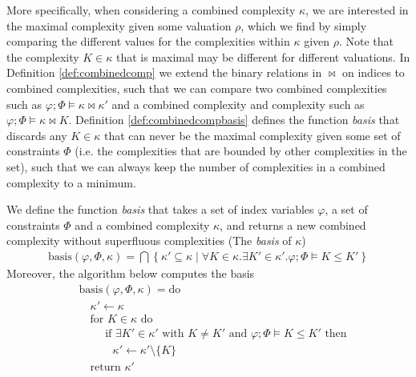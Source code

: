 More specifically, when considering a combined complexity $\kappa$, we are interested in the maximal complexity given some valuation $\rho$, which we find by simply comparing the different values for the complexities within $\kappa$ given $\rho$. Note that the complexity $K \in \kappa$ that is maximal may be different for different valuations. In Definition \ref{def:combinedcomp} we extend the binary relations in $\bowtie$ on indices to combined complexities, such that we can compare two combined complexities such as $\varphi;\Phi \vDash \kappa \bowtie \kappa'$ and a combined complexity and complexity such as $\varphi;\Phi \vDash \kappa \bowtie K$. Definition \ref{def:combinedcompbasis} defines the function \textit{basis} that discards any $K \in \kappa$ that can never be the maximal complexity given some set of constraints $\Phi$ (i.e. the complexities that are bounded by other complexities in the set), such that we can always keep the number of complexities in a combined complexity to a minimum. %
%
\begin{defi}\label{def:combinedcompbasis}
    We define the function \textit{basis} that takes a set of index variables $\varphi$, a set of constraints $\Phi$ and a combined complexity $\kappa$, and returns a new combined complexity without superfluous complexities (The \textit{basis} of $\kappa$)
    \begin{align*}
        \text{basis}(\varphi,\Phi,\kappa) = \bigcap\left\{ \kappa' \subseteq \kappa \mid \forall K\in\kappa.\exists K'\in\kappa'.\varphi;\Phi\vDash K \leq K' \right\}
    \end{align*}
    Moreover, the algorithm below computes the basis
    \begin{align*}
        &\text{basis}(\varphi, \Phi, \kappa) = \text{do}\\[-0.5em]
        &\quad \kappa' \leftarrow \kappa\\[-0.5em]
        &\quad \text{for } K \in \kappa \text{ do}\\[-0.5em]
        &\quad\quad \text{ if } \exists K' \in \kappa' \text{ with } K \not = K' \text{ and } \varphi;\Phi \vDash K \leq K' \text{ then}\\[-0.5em]
        &\quad\quad\quad \kappa' \leftarrow \kappa' \setminus \{K\}\\[-0.5em]
        &\quad \text{return } \kappa'
    \end{align*}
\end{defi}
%

